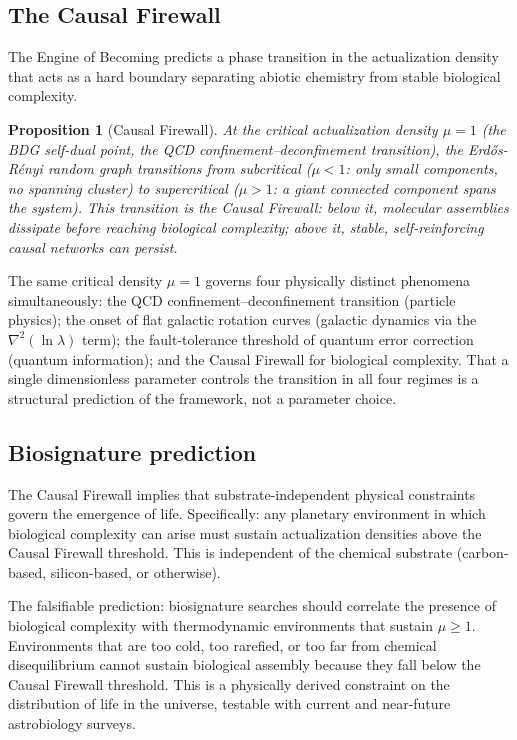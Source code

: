 \documentclass[11pt,twocolumn]{article}
\theoremstyle{plain}
\newtheorem{proposition}[theorem]{Proposition}
\theoremstyle{remark}
\begin{document}
\subsection{The Causal Firewall}

The Engine of Becoming predicts a phase transition in the
actualization density that acts as a hard boundary separating
abiotic chemistry from stable biological complexity.

\begin{proposition}[Causal Firewall]
\label{prop:firewall}
At the critical actualization density $\mu = 1$ (the BDG self-dual
point, the QCD confinement--deconfinement transition), the
Erd\H{o}s-R\'{e}nyi random graph transitions from subcritical
($\mu < 1$: only small components, no spanning cluster) to
supercritical ($\mu > 1$: a giant connected component spans the
system).
This transition is the \emph{Causal Firewall}: below it, molecular
assemblies dissipate before reaching biological complexity; above
it, stable, self-reinforcing causal networks can persist.
\end{proposition}

The same critical density $\mu = 1$ governs four physically
distinct phenomena simultaneously: the QCD confinement--deconfinement
transition (particle physics); the onset of flat galactic rotation
curves (galactic dynamics via the $\nabla^2(\ln\lambda)$ term);
the fault-tolerance threshold of quantum error correction (quantum
information); and the Causal Firewall for biological complexity.
That a single dimensionless parameter controls the transition in
all four regimes is a structural prediction of the framework,
not a parameter choice.

\subsection{Biosignature prediction}

The Causal Firewall implies that substrate-independent physical
constraints govern the emergence of life.
Specifically: any planetary environment in which biological
complexity can arise must sustain actualization densities above
the Causal Firewall threshold.
This is independent of the chemical substrate (carbon-based,
silicon-based, or otherwise).

The falsifiable prediction: biosignature searches should correlate
the presence of biological complexity with thermodynamic environments
that sustain $\mu \geq 1$.
Environments that are too cold, too rarefied, or too far from
chemical disequilibrium cannot sustain biological assembly because
they fall below the Causal Firewall threshold.
This is a physically derived constraint on the distribution of life
in the universe, testable with current and near-future
astrobiology surveys.
\end{document}
